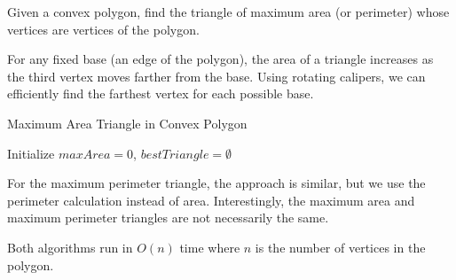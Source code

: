 Given a convex polygon, find the triangle of maximum area (or perimeter) whose vertices are vertices of the polygon.

\begin{intuition}
For any fixed base (an edge of the polygon), the area of a triangle increases as the third vertex moves farther from the base. Using rotating calipers, we can efficiently find the farthest vertex for each possible base.
\end{intuition}

\begin{algorithm}[H]
\SetAlgoLined
\caption{Maximum Area Triangle in Convex Polygon}

Initialize $maxArea = 0$, $bestTriangle = \emptyset$\;

\;
\end{algorithm}

\begin{implementation}
For the maximum perimeter triangle, the approach is similar, but we use the perimeter calculation instead of area. Interestingly, the maximum area and maximum perimeter triangles are not necessarily the same.
\end{implementation}

\begin{complexity}
Both algorithms run in $O(n)$ time where $n$ is the number of vertices in the polygon.
\end{complexity}